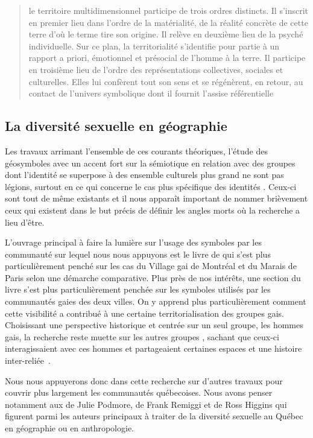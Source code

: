 \blockquote[{\cite[108]{DiMeo1998}}][.]{\textelp{} le territoire multidimensionnel participe de trois ordres distincts. Il s'inscrit en premier lieu dans l'ordre de la matérialité, de la réalité concrète de cette terre d'où le terme tire son origine. Il relève en deuxième lieu de la psyché individuelle. Sur ce plan, la territorialité s'identifie pour partie à un rapport a priori, émotionnel et présocial de l'homme à la terre. Il participe en troisième lieu de l'ordre des représentations collectives, sociales et culturelles. Elles lui confèrent tout son sens et se régénèrent, en retour, au contact de l'univers symbolique dont il fournit l'assise référentielle}.



\subsection{La diversité sexuelle en géographie}
\label{sec:la_diversit_sexuelle_en_g_ographie}  
Les travaux arrimant l'ensemble de ces courants théoriques, l'étude des géosymboles avec un accent fort sur la sémiotique en relation avec des groupes dont l'identité se superpose à des ensemble culturels plus grand ne sont pas légions, surtout en ce qui concerne le cas plus spécifique des identités \lgbt{}. 
Ceux-ci sont tout de même existants et il nous apparaît important de nommer brièvement ceux qui existent dans le but précis de définir les angles morts où la recherche a lieu d'être.

L'ouvrage principal à faire la lumière sur l'usage des symboles par les communauté \lgbt{} sur lequel nous nous appuyons est le livre  de \citet{Giraud2014} qui s'est plus particulièrement penché sur les cas du Village gai de Montréal et du Marais de Paris selon une démarche comparative. 
Plus près de nos intérêts, une section du livre s'est plus particulièrement penchée sur les symboles utilisés par les communautés gaies des deux villes. 
On y apprend plus particulièrement comment cette visibilité a contribué à une certaine territorialisation des groupes gais. 
Choisissant une perspective historique et centrée sur un seul groupe, les hommes gais, la recherche reste muette sur les autres groupes \lgbt{}, sachant que ceux-ci interagissaient avec ces hommes et partageaient certaines espaces et une histoire inter-reliée~\citep{Remiggi2000,Demczuk1998,Podmore2001,Higgins1997,Higgins1999}.

Nous nous appuyerons donc dans cette recherche sur d'autres travaux pour couvrir plus largement les communautés \lgbt{} québecoises. 
Nous avons penser notamment aux de Julie Podmore, de Frank Remiggi et de Ross Higgins qui figurent parmi les auteurs principaux à traiter de la diversité sexuelle au Québec en géographie ou en anthropologie.


